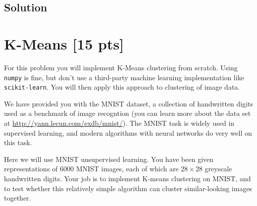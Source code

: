 \documentclass[submit]{harvardml}
\begin{document}
	\subsection*{Solution}
	
	
	
	
	\newpage
	
	\section*{K-Means [15 pts]}
	
	For this problem you will implement  K-Means clustering from scratch. Using \texttt{numpy} is fine, but don't use a
	third-party machine learning implementation like \texttt{scikit-learn}. You will then apply this approach to clustering of image data.  
	
	
	
	We have provided you with the MNIST dataset, a collection of handwritten digits used as a benchmark of image recogntion (you  can
	learn more about the data set at  \url{http://yann.lecun.com/exdb/mnist/}). The MNIST task
	is widely used in supervised learning, and modern algorithms with neural
	networks do very well on this task. 
	
	Here we will use MNIST unsupervised learning. You have been given
	representations of 6000 MNIST images, each of which are $28\times28$
	greyscale handwritten digits. Your job is to implement K-means
	clustering on MNIST, and to test whether this relatively simple algorithm can
	cluster similar-looking images together.
	
	~
	
\end{document}
